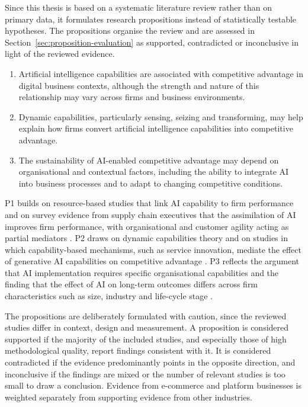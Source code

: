 Since this thesis is based on a systematic literature review rather than on primary data, it formulates research propositions instead of statistically testable hypotheses. The propositions organise the review and are assessed in Section~\ref{sec:proposition-evaluation} as supported, contradicted or inconclusive in light of the reviewed evidence.

\begin{enumerate}[label=P\arabic*:, leftmargin=1.2cm]
  \item Artificial intelligence capabilities are associated with competitive advantage in digital business contexts, although the strength and nature of this relationship may vary across firms and business environments.
  \item Dynamic capabilities, particularly sensing, seizing and transforming, may help explain how firms convert artificial intelligence capabilities into competitive advantage.
  \item The sustainability of AI-enabled competitive advantage may depend on organisational and contextual factors, including the ability to integrate AI into business processes and to adapt to changing competitive conditions.
\end{enumerate}

P1 builds on resource-based studies that link AI capability to firm performance \parencite[1]{mikalef2021capability} and on survey evidence from supply chain executives that the assimilation of AI improves firm performance, with organisational and customer agility acting as partial mediators \parencite[1]{fossowamba2022}. P2 draws on dynamic capabilities theory \parencite[1319]{teece2007} and on studies in which capability-based mechanisms, such as service innovation, mediate the effect of generative AI capabilities on competitive advantage \parencite[10]{li2025}. P3 reflects the argument that AI implementation requires specific organisational capabilities \parencite[1549]{weber2023} and the finding that the effect of AI on long-term outcomes differs across firm characteristics such as size, industry and life-cycle stage \parencite[1]{liang2026}.

The propositions are deliberately formulated with caution, since the reviewed studies differ in context, design and measurement. A proposition is considered supported if the majority of the included studies, and especially those of high methodological quality, report findings consistent with it. It is considered contradicted if the evidence predominantly points in the opposite direction, and inconclusive if the findings are mixed or the number of relevant studies is too small to draw a conclusion. Evidence from e-commerce and platform businesses is weighted separately from supporting evidence from other industries.

